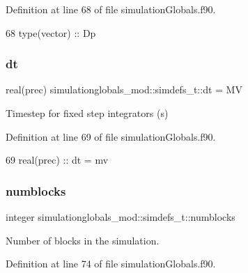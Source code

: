 Definition at line 68 of file simulation\+Globals.\+f90.


\begin{DoxyCode}
68         \textcolor{keywordtype}{type}(vector)    ::  Dp
\end{DoxyCode}
\mbox{\label{structsimulationglobals__mod_1_1simdefs__t_a3893522d33efbdcb47d81ed1963a228c}} 
\subsubsection{\texorpdfstring{dt}{dt}}
{\footnotesize\ttfamily real(prec) simulationglobals\+\_\+mod\+::simdefs\+\_\+t\+::dt = MV\hspace{0.3cm}{\ttfamily [private]}}



Timestep for fixed step integrators (s) 



Definition at line 69 of file simulation\+Globals.\+f90.


\begin{DoxyCode}
69         \textcolor{keywordtype}{real(prec)}      ::  dt = mv         
\end{DoxyCode}
\mbox{\label{structsimulationglobals__mod_1_1simdefs__t_adf59068d8301acd45881aea6cccd8644}} 
\subsubsection{\texorpdfstring{numblocks}{numblocks}}
{\footnotesize\ttfamily integer simulationglobals\+\_\+mod\+::simdefs\+\_\+t\+::numblocks\hspace{0.3cm}{\ttfamily [private]}}



Number of blocks in the simulation. 



Definition at line 74 of file simulation\+Globals.\+f90.


